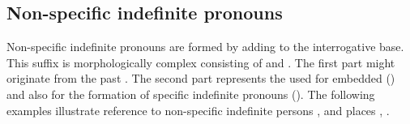 
\subsection{Non-specific indefinite pronouns}
\label{ssec:Non-specific indefinite pronouns}

Non-specific indefinite pronouns are formed by adding  to the interrogative base. This suffix is morphologically complex consisting of  and . The first part might originate from the past  . The second part represents the  used for embedded  () and also for the formation of specific indefinite pronouns (). The following examples illustrate reference to non-specific indefinite persons ,  and places , .

